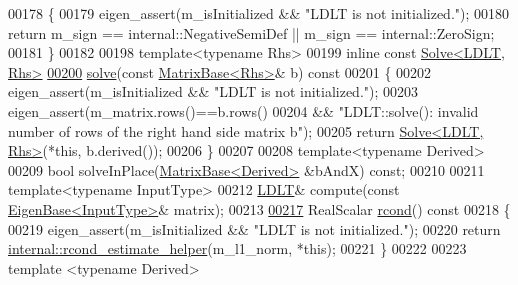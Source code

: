 \begin{DoxyCode}
00178 \textcolor{keyword}{    }\{
00179       eigen\_assert(m\_isInitialized && \textcolor{stringliteral}{"LDLT is not initialized."});
00180       \textcolor{keywordflow}{return} m\_sign == internal::NegativeSemiDef || m\_sign == internal::ZeroSign;
00181     \}
00182 
00198     \textcolor{keyword}{template}<\textcolor{keyword}{typename} Rhs>
00199     \textcolor{keyword}{inline} \textcolor{keyword}{const} \hyperlink{group___core___module_class_eigen_1_1_solve}{Solve<LDLT, Rhs>}
\hyperlink{group___cholesky___module_aa257dd7a8acf8b347d5a22a13d6ca3e1}{00200}     \hyperlink{group___cholesky___module_aa257dd7a8acf8b347d5a22a13d6ca3e1}{solve}(\textcolor{keyword}{const} \hyperlink{group___core___module_class_eigen_1_1_matrix_base}{MatrixBase<Rhs>}& b)\textcolor{keyword}{ const}
00201 \textcolor{keyword}{    }\{
00202       eigen\_assert(m\_isInitialized && \textcolor{stringliteral}{"LDLT is not initialized."});
00203       eigen\_assert(m\_matrix.rows()==b.rows()
00204                 && \textcolor{stringliteral}{"LDLT::solve(): invalid number of rows of the right hand side matrix b"});
00205       \textcolor{keywordflow}{return} \hyperlink{group___core___module_class_eigen_1_1_solve}{Solve<LDLT, Rhs>}(*\textcolor{keyword}{this}, b.derived());
00206     \}
00207 
00208     \textcolor{keyword}{template}<\textcolor{keyword}{typename} Derived>
00209     \textcolor{keywordtype}{bool} solveInPlace(\hyperlink{group___core___module_class_eigen_1_1_matrix_base}{MatrixBase<Derived>} &bAndX) \textcolor{keyword}{const};
00210 
00211     \textcolor{keyword}{template}<\textcolor{keyword}{typename} InputType>
00212     \hyperlink{group___cholesky___module_class_eigen_1_1_l_d_l_t}{LDLT}& compute(\textcolor{keyword}{const} \hyperlink{group___core___module_struct_eigen_1_1_eigen_base}{EigenBase<InputType>}& matrix);
00213 
\hyperlink{group___cholesky___module_ae646403fdde3a4b18e278a32c61a0953}{00217}     RealScalar \hyperlink{group___cholesky___module_ae646403fdde3a4b18e278a32c61a0953}{rcond}()\textcolor{keyword}{ const}
00218 \textcolor{keyword}{    }\{
00219       eigen\_assert(m\_isInitialized && \textcolor{stringliteral}{"LDLT is not initialized."});
00220       \textcolor{keywordflow}{return} \hyperlink{namespace_eigen_1_1internal_ad1de0d785387bfb5435c410bf0554068}{internal::rcond\_estimate\_helper}(m\_l1\_norm, *\textcolor{keyword}{this});
00221     \}
00222 
00223     \textcolor{keyword}{template} <\textcolor{keyword}{typename} Derived>

\end{DoxyCode}
